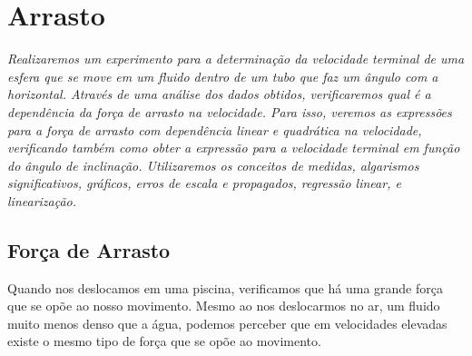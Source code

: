 \chapter{Arrasto} %
\label{Chap:ExpArrasto}        %

\begin{fullwidth}\it
	Realizaremos um experimento para a determinação da velocidade terminal de uma esfera que se move em um fluido dentro de um tubo que faz um ângulo com a horizontal. Através de uma análise dos dados obtidos, verificaremos qual é a dependência da força de arrasto na velocidade. Para isso, veremos as expressões para a força de arrasto com dependência linear e quadrática na velocidade, verificando também como obter a expressão para a velocidade terminal em função do ângulo de inclinação. Utilizaremos os conceitos de medidas, algarismos significativos, gráficos, erros de escala e propagados, regressão linear, e linearização.
\end{fullwidth}

\section{Força de Arrasto}

Quando nos deslocamos em uma piscina, verificamos que há uma grande força que se opõe ao nosso movimento. Mesmo ao nos deslocarmos no ar, um fluido muito menos denso que a água, podemos perceber que em velocidades elevadas existe o mesmo tipo de força que se opõe ao movimento. 

